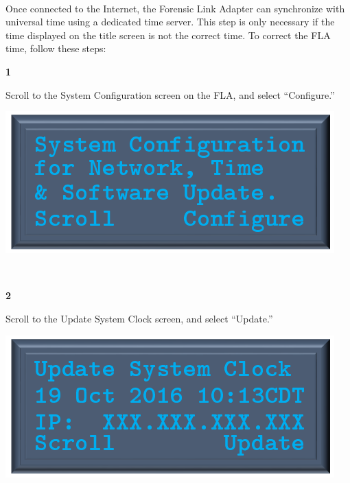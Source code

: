 \documentclass[11pt, oneside]{book}
\begin{document}
\paragraph{  }
Once connected to the Internet, the Forensic Link Adapter can synchronize
with universal time using a dedicated time server. This step is only
necessary if the time displayed on the title screen is not the correct
time.
To correct the FLA time, follow these steps:
\\[\baselineskip]
\noindent\begin{minipage}{0.45\textwidth}%
	\begin{center}
		\textbf{1}
	\end{center}
	 Scroll to the System Configuration screen on the FLA, and select ``Configure.''
\end{minipage}%
\hfill%
\begin{minipage}{0.45\textwidth} 
	\includegraphics[width=\linewidth]{../media/pstricks_files/06_system_configuration}
\end{minipage}\\[\baselineskip]
\noindent\begin{minipage}{0.45\textwidth}%
	\begin{center}
		\textbf{2}
	\end{center}
	Scroll to the Update System Clock screen, and select ``Update.''
\end{minipage}%
\hfill%
\begin{minipage}{0.45\textwidth} 
	\includegraphics[width=\linewidth]{../media/pstricks_files/09_update_system_clock}
\end{minipage}\\[\baselineskip]
\end{document}
